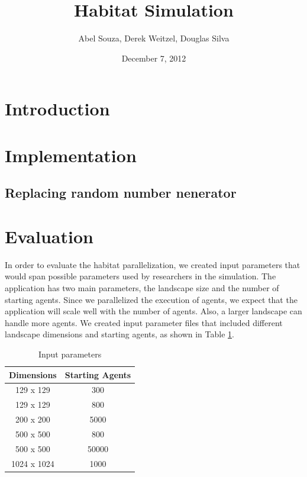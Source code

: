 \documentclass[12pt, notitlepage]{article}
\begin{document}
\title{Habitat Simulation}
\author{Abel Souza, Derek Weitzel, Douglas Silva}
\date{December 7, 2012}

\maketitle

\section{Introduction}

\section{Implementation}


\subsection{Replacing random number nenerator}

\section{Evaluation}

In order to evaluate the habitat parallelization, we created input parameters that would span possible parameters used by researchers in the simulation.  The application has two main parameters, the landscape size and the number of starting agents.  Since we parallelized the execution of agents, we expect that the application will scale well with the number of agents.  Also, a larger landscape can handle more agents.  We created input parameter files that included different landscape dimensions and starting agents, as shown in Table \ref{tab:parameters}.

\begin{table}[ht]
\centering
\begin{tabular}{ c | c }
\textbf{Dimensions} & \textbf{Starting Agents} \\ 
\hline \hline
129 x 129 & 300 \\
129 x 129 & 800 \\
200 x 200 & 5000 \\
500 x 500 & 800 \\
500 x 500 & 50000 \\
1024 x 1024 & 1000
\end{tabular}
\caption{Input parameters} \label{tab:parameters}
\end{table}
\end{document}
